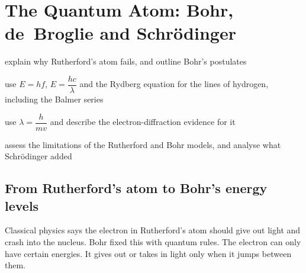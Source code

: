 \chapter[The Quantum Atom]{The Quantum Atom: Bohr, de~Broglie and Schrödinger}\label{ch3:chap}


\begin{goals}
  \item explain why Rutherford's atom fails, and outline Bohr's postulates
  \item use $E = hf$, $E = \dfrac{hc}{\lambda}$ and the Rydberg equation for the lines of
        hydrogen, including the Balmer series
  \item use $\lambda = \dfrac{h}{mv}$ and describe the electron-diffraction evidence for it
  \item assess the limitations of the Rutherford and Bohr models, and analyse what
        Schrödinger added
\end{goals}

\section{From Rutherford's atom to Bohr's energy levels}\label{ch3:sec:bohr}

\begin{bigidea}
Classical physics says the electron in Rutherford's atom should give out light and crash into
the nucleus. Bohr fixed this with quantum rules. The electron can only have certain energies.
It gives out or takes in light only when it jumps between them.
\end{bigidea}

\begin{keywords}[breakable]
\end{keywords}

